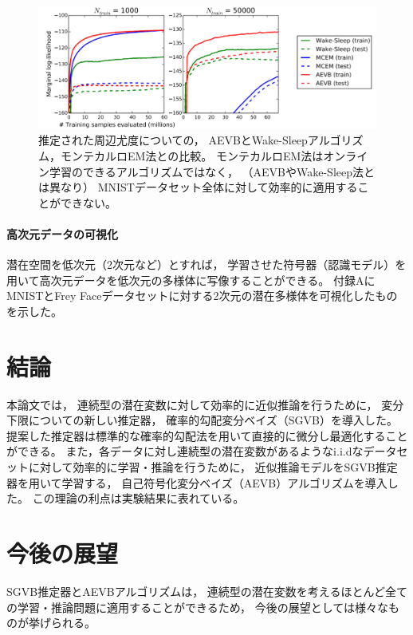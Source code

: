 \documentclass[dvipdfmx, fleqn]{jsarticle}
\begin{document}
\begin{figure}
    \centering
    \includegraphics[clip, width=15cm]{../figures/comparison_MCMC}
    \caption{
        推定された周辺尤度についての，
        AEVBとWake-Sleepアルゴリズム，モンテカルロEM法との比較。
        モンテカルロEM法はオンライン学習のできるアルゴリズムではなく，
        （AEVBやWake-Sleep法とは異なり）
        MNISTデータセット全体に対して効率的に適用することができない。
        }
    \label{fig:comparison_MCMC}
\end{figure}


\paragraph{高次元データの可視化}

潜在空間を低次元（2次元など）とすれば，
学習させた符号器（認識モデル）を用いて高次元データを低次元の多様体に写像することができる。
付録AにMNISTとFrey Faceデータセットに対する2次元の潜在多様体を可視化したものを示した。



\section{結論}

本論文では，
連続型の潜在変数に対して効率的に近似推論を行うために，
変分下限についての新しい推定器，
確率的勾配変分ベイズ（SGVB）を導入した。
提案した推定器は標準的な確率的勾配法を用いて直接的に微分し最適化することができる。
また，各データに対し連続型の潜在変数があるようなi.i.dなデータセットに対して効率的に学習・推論を行うために，
近似推論モデルをSGVB推定器を用いて学習する，
自己符号化変分ベイズ（AEVB）アルゴリズムを導入した。
この理論の利点は実験結果に表れている。



\section{今後の展望}

SGVB推定器とAEVBアルゴリズムは，
連続型の潜在変数を考えるほとんど全ての学習・推論問題に適用することができるため，
今後の展望としては様々なものが挙げられる。
\end{document}

